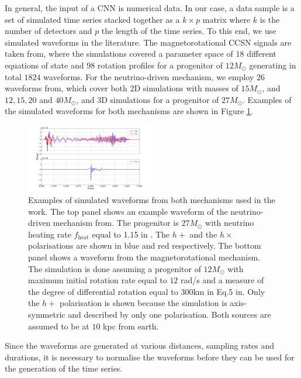 \documentclass[aps,twocolumn,showpacs,groupedaddress, nofootinbib]{revtex4}  %
\begin{document}
In general, the input of a \ac{CNN} is numerical data.
In our case, a data sample is a set of simulated time series stacked together as a $k \times p$ matrix 
where $k$ is the number of detectors and $p$ the length of the time series.
To this end, we use simulated waveforms in the literature.
The magnetorotational \ac{CCSN} signals are taken from\cite{richers2017equation}, where the simulations covered a parameter space of $18$ different equations of state 
and $98$ rotation profiles for a progenitor of $12M_{\odot}$ generating in total $1824$ waveforms.
For the neutrino-driven mechanism, we employ $26$ waveforms from\cite{ott2009gravitational, murphy2009model, ott2013general}, 
which cover both 2D simulations with masses of $15M_{\odot}$\cite{ott2009gravitational}, 
and $12, 15, 20$ and $40M_{\odot}$\cite{ murphy2009model}, and 3D simulations for a progenitor of $27M_{\odot}$\cite{ott2013general}.
Examples of the simulated waveforms for both mechanisms are shown in Figure \ref{fig:waveforms}.
\begin{figure}
\includegraphics[width=0.5\textwidth]{whynotdecrease.png}
\caption{Examples of simulated waveforms from both mechanisms used in the work.
The top panel shows an example waveform of the neutrino-driven mechanism from\cite{ott2013general}. 
The progenitor is $27M_\odot$ with neutrino heating rate $f_\text{heat}$ equal to 1.15 in \cite{ott2013general}. 
The $h+$ and the $h\times$ polarisations are shown in blue and red respectively.
The bottom panel shows a waveform from the magnetorotational mechanism.
The simulation is done assuming a progenitor of  $12M_\odot$ with maximum initial rotation rate equal to $12$ rad/s 
and a measure of the degree of differential rotation equal to $300$km 
in Eq.5 in\cite{richers2017equation}.
Only the $h+$ polarisation is shown because the simulation is axis-symmetric and described by only one polarisation. 
Both sources are assumed to be at $10$ kpc from earth.
\label{fig:waveforms}}
\end{figure}
Since the waveforms are generated at various distances, sampling rates and durations, 
it is necessary to normalise the waveforms before they can be used for the generation of the time series.
\end{document}
